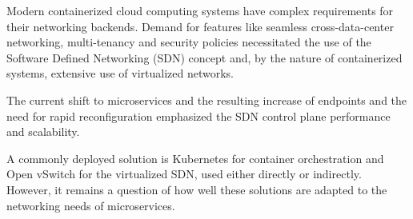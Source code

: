 

% 
% 
% 



Modern containerized cloud computing systems have complex requirements for their networking backends. Demand for features like seamless cross-data-center networking, multi-tenancy and security policies necessitated the use of the Software Defined Networking (SDN) concept and, by the nature of containerized systems, extensive use of virtualized networks.

The current shift to microservices and the resulting increase of endpoints and the need for rapid reconfiguration emphasized the SDN control plane performance and scalability.

A commonly deployed solution is Kubernetes for container orchestration and Open vSwitch for the virtualized SDN, used either directly or indirectly. However, it remains a question of how well these solutions are adapted to the networking needs of microservices.

